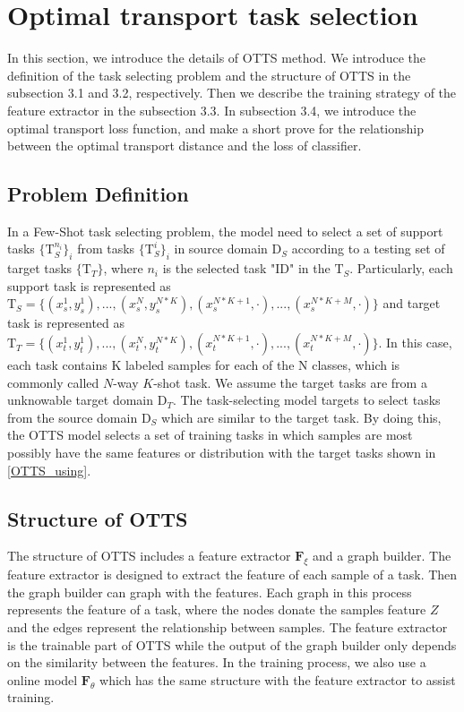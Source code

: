 \documentclass[10pt,journal,compsoc]{IEEEtran}
\begin{document}
\section{Optimal transport task selection}

In this section, we introduce the details of OTTS method. We introduce the definition of the task selecting problem and the structure of OTTS in the subsection 3.1 and 3.2, respectively. Then we describe the training strategy of the feature extractor in the subsection 3.3. In subsection 3.4, we introduce the optimal transport loss function, and make a short prove for the relationship between the optimal transport distance and the loss of classifier.

\subsection{Problem Definition}

In a Few-Shot task selecting problem, the model need to select a set of support tasks $\{\mathrm{T}^{n_i}_{S}\}_{i}$ from tasks $\{\mathrm{T}^i_{S}\}_i$ in source domain $\mathrm{D}_S$ according to a testing set of target tasks $\{\mathrm{T}_T\}$, where ${n_i}$ is the selected task "ID" in the $\mathrm{T}_S$. Particularly, each support task is represented as $\mathrm{T}_S=\{(x_s^1,y_s^1),...,(x_s^N,y_s^{N*K}),(x_{s}^{N*K+1},\cdot),...,(x_{s}^{N*K+M},\cdot)\}$ and target task is represented as $\mathrm{T}_T=\{(x_t^1,y_t^1),...,(x_t^N,y_t^{N*K}),(x_{t}^{N*K+1},\cdot),...,(x_{t}^{N*K+M},\cdot)\}$. In this case, each task contains K labeled samples for each of the N classes, which is commonly called $N$-way $K$-shot task. We assume the target tasks are from a unknowable target domain $\mathrm{D}_T$. The task-selecting model targets to select tasks from the source domain $\mathrm{D}_S$ which are similar to the target task. By doing this, the OTTS model selects a set of training tasks in which samples are most possibly have the same features or distribution with the target tasks shown in \ref{OTTS_using}.

\subsection{Structure of OTTS}

The structure of OTTS includes a feature extractor $\mathbf{F}_\xi$ and a graph builder. The feature extractor is designed to extract the feature of each sample of a task. Then the graph builder can graph with the features. Each graph in this process represents the feature of a task, where the nodes donate the samples feature $Z$ and the edges represent the relationship between samples. The feature extractor is the trainable part of OTTS while the output of the graph builder only depends on the similarity between the features. In the training process, we also use a online model $\mathbf{F}_\theta$ which has the same structure with the feature extractor to assist training. 
\end{document}

